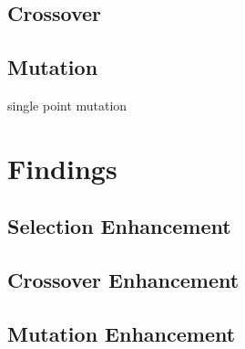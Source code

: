 \documentclass[a4paper, twocolumn]{article}
\begin{document}
\subsection{Crossover\label{sec:Crossover}}
\subsection{Mutation\label{sec:Mutation}}
single point mutation

\section{Findings\label{sec:Findings}}
\subsection{Selection Enhancement\label{sec:Selection Enhancement}}
\subsection{Crossover Enhancement\label{sec:Crossover Enhancement}}
\subsection{Mutation Enhancement\label{sec:Mutation Enhancement}}
\printbibliography
\end{document}

